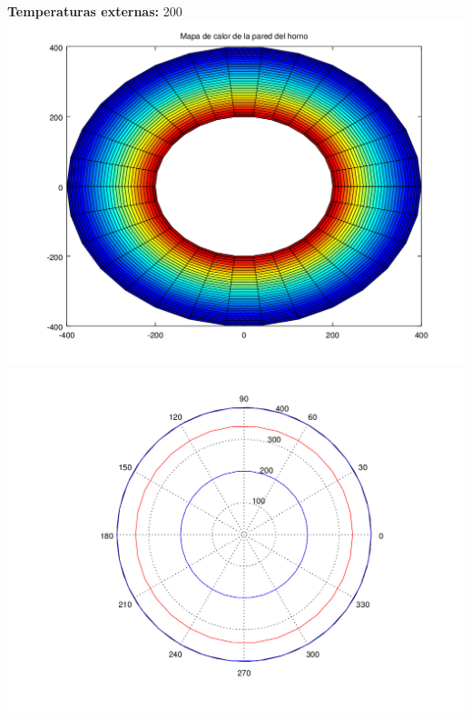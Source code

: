 	\textbf{Temperaturas externas: } 200\\
	\includegraphics[scale=0.35]{experimentos1a_1b/evolucion_isoterma_cambios_temperatura_varias_discretizaciones/test21_030_radios_030_angulos_inst_001_heatmap.png}
	\includegraphics[scale=0.35]{experimentos1a_1b/evolucion_isoterma_cambios_temperatura_varias_discretizaciones/test21_030_radios_030_angulos_inst_001_isomap.png}

